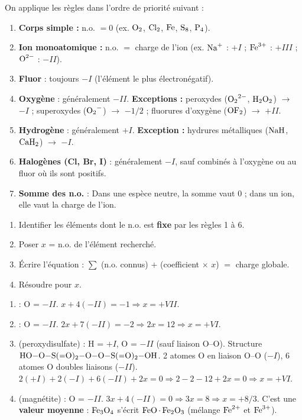 \documentclass[11pt]{article}
\begin{document}
\begin{propriete}
On applique les règles dans l'ordre de priorité suivant :
\begin{enumerate}
\item \textbf{Corps simple :} n.o. $= 0$ (ex. $\ce{O2}$, $\ce{Cl2}$, $\ce{Fe}$, $\ce{S8}$, $\ce{P4}$).
\item \textbf{Ion monoatomique :} n.o. $=$ charge de l'ion (ex. $\ce{Na+}$ : $+I$ ; $\ce{Fe^3+}$ : $+III$ ; $\ce{O^2-}$ : $-II$).
\item \textbf{Fluor} : toujours $-I$ (l'élément le plus électronégatif).
\item \textbf{Oxygène} : généralement $-II$. \textbf{Exceptions :} peroxydes ($\ce{O2^2-}$, $\ce{H2O2}$) $\to$ $-I$ ; superoxydes ($\ce{O2-}$) $\to$ $-1/2$ ; fluorures d'oxygène ($\ce{OF2}$) $\to$ $+II$.
\item \textbf{Hydrogène} : généralement $+I$. \textbf{Exception :} hydrures métalliques ($\ce{NaH}$, $\ce{CaH2}$) $\to$ $-I$.
\item \textbf{Halogènes (Cl, Br, I)} : généralement $-I$, sauf combinés à l'oxygène ou au fluor où ils sont positifs.
\item \textbf{Somme des n.o.} : Dans une espèce neutre, la somme vaut $0$ ; dans un ion, elle vaut la charge de l'ion.
\end{enumerate}
\end{propriete}

\begin{methode}
\begin{enumerate}
\item Identifier les éléments dont le n.o. est \textbf{fixe} par les règles 1 à 6.
\item Poser $x$ = n.o. de l'élément recherché.
\item Écrire l'équation : $\sum$ (n.o. connus) $+$ (coefficient $\times$ $x$) $=$ charge globale.
\item Résoudre pour $x$.
\end{enumerate}
\end{methode}

\begin{exemplebox}
\begin{enumerate}
\item {} : O = $-II$. $x + 4(-II) = -1 \Rightarrow x = +VII$.
\item {} : O = $-II$. $2x + 7(-II) = -2 \Rightarrow 2x = 12 \Rightarrow x = +VI$.
\item {} (peroxydisulfate) : H = $+I$, O = $-II$ (sauf liaison O--O). Structure $\ce{HO-O-S(=O)2-O-O-S(=O)2-OH}$. 2 atomes O en liaison O--O ($-I$), 6 atomes O doubles liaisons ($-II$). $2(+I) + 2(-I) + 6(-II) + 2x = 0 \Rightarrow 2 - 2 - 12 + 2x = 0 \Rightarrow x = +VI$.
\item {} (magnétite) : O = $-II$. $3x + 4(-II) = 0 \Rightarrow 3x = 8 \Rightarrow x = +8/3$. C'est une \textbf{valeur moyenne} : $\ce{Fe3O4}$ s'écrit $\ce{FeO.Fe2O3}$ (mélange $\ce{Fe^2+}$ et $\ce{Fe^3+}$).
\end{enumerate}
\end{exemplebox}
\end{document}
